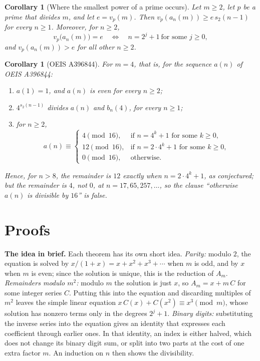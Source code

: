 \documentclass[11pt,a4paper]{article}
\newtheorem{corollary}[theorem]{Corollary}
\theoremstyle{definition}
\theoremstyle{remark}
\newcommand{\para}[1]{\par\medskip\noindent\textbf{#1}\enspace}
\begin{document}
\begin{corollary}[Where the smallest power of a prime occurs]\label{cor:val}
Let $m\ge2$, let $p$ be a prime that divides $m$, and let $e=v_p(m)$. Then $v_p(a_n(m))\ge e\,s_2(n-1)$ for every
$n\ge1$. Moreover, for $n\ge2$,
\[
v_p\bigl(a_n(m)\bigr)=e\quad\Longleftrightarrow\quad n=2^j+1\ \text{for some }j\ge0,
\]
and $v_p(a_n(m))>e$ for all other $n\ge2$.
\end{corollary}

\begin{corollary}[OEIS A396844]\label{cor:entry}
For $m=4$, that is, for the sequence $a(n)$ of OEIS A396844:
\begin{enumerate}[label=(\alph*)]
\item $a(1)=1$, and $a(n)$ is even for every $n\ge2$;
\item $4^{s_2(n-1)}$ divides $a(n)$ and $b_n(4)$, for every $n\ge1$;
\item for $n\ge2$,
\[
a(n)\equiv\begin{cases}4\pmod{16},&\text{if }n=4^k+1\text{ for some }k\ge0,\\
12\pmod{16},&\text{if }n=2\cdot4^k+1\text{ for some }k\ge0,\\
0\pmod{16},&\text{otherwise.}\end{cases}
\]
\end{enumerate}
Hence, for $n>8$, the remainder is $12$ exactly when $n=2\cdot4^k+1$, as conjectured; but the remainder is $4$, not $0$,
at $n=17,65,257,\dots$, so the clause ``otherwise $a(n)$ is divisible by $16$'' is false.
\end{corollary}

\section{Proofs}\label{sec:proofs}

\para{The idea in brief.} Each theorem has its own short idea.
\emph{Parity:} modulo $2$, the equation is solved by $x/(1+x)=x+x^2+x^3+\cdots$ when $m$ is odd, and by $x$ when $m$ is
even; since the solution is unique, this is the reduction of $A_m$.
\emph{Remainders modulo $m^2$:} modulo $m$ the solution is just $x$, so $A_m=x+m\,C$ for some integer series $C$.
Putting this into the equation and discarding multiples of $m^2$ leaves the simple linear equation
$x\,C(x)+C(x^2)\equiv x^3\pmod m$, whose solution has nonzero terms only in the degrees $2^j+1$.
\emph{Binary digits:} substituting the inverse series into the equation gives an identity that expresses each
coefficient through earlier ones. In that identity, an index is either halved, which does not change its binary digit
sum, or split into two parts at the cost of one extra factor $m$. An induction on $n$ then shows the divisibility.
\end{document}
